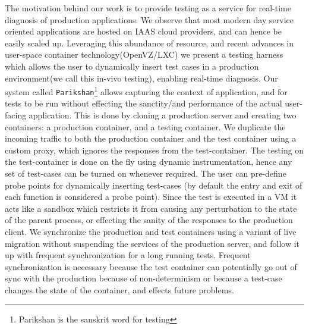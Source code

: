 The motivation behind our work is to provide testing as a service for real-time diagnosis of production applications.
We observe that most modern day service oriented applications are hosted on IAAS cloud providers, and can hence be easily scaled  up. 
Leveraging this abundance of resource, and recent advances in user-space container technology(OpenVZ/LXC\cite{openvz,linux}) we present a testing harness which allows the user to dynamically insert test cases in a production environment(we call this in-vivo testing), enabling real-time diagnosis.
Our system called \texttt{Parikshan}\footnote{Parikshan is the sanskrit word for testing} allows capturing the context of application, and for tests to be run without effecting the sanctity/and performance of the actual user-facing application. 
This is done by cloning a production server and creating two containers: a production container, and a testing container. 
We duplicate the incoming traffic to both the production container and the test container using a custom proxy, which ignores the responses from the test-container. 
The testing on the test-container is done on the fly using dynamic instrumentation, hence any set of test-cases can be turned on whenever required. 
The user can pre-define probe points for dynamically inserting test-cases (by default the entry and exit of each function is considered a probe point).
Since the test is executed in a VM it acts like a sandbox which restricts it from causing any perturbation to the state of the parent process, or effecting the sanity of the responses to the production client. 
We synchronize the production and test containers using a variant of live migration without suspending the services of the production server, and follow it up with frequent synchronization for a long running tests. 
Frequent synchronization is necessary because the test container can potentially go out of sync with the production because of non-determinism or because a test-case changes the state of the container, and effects future problems. 

